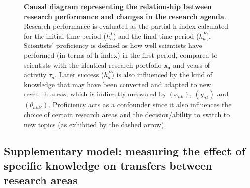 \documentclass{article}
\begin{document}
\begin{figure}[h]
    \centering
    \caption{\textbf{Causal diagram representing the relationship between research performance and changes in the research agenda}. Research performance is evaluated as the partial h-index calculated for the initial time-period ($h_a^I$) and the final time-period ($h_a^F$). Scientists' proficiency is defined as how well scientists have performed (in terms of h-index) in the first period, compared to scientists with the identical research portfolio $\bm{x_a}$ and years of activity $\tau_a$. Later success ($h_a^F$) is also influenced by the kind of knowledge that may have been converted and adapted to new research areas, which is indirectly measured by $(x_{ak})$, $(y_{ak})$ and $(\theta_{akk'})$. Proficiency acts as a confounder since it also influences the choice of certain research areas and the decision/ability to switch to new topics (as exhibited by the dashed arrow). }
    \label{fig:outcomes_causal_dag}
\end{figure}


\subsection{\label{appendix:knowledge}Supplementary model: measuring the effect of specific knowledge on transfers between research areas}
\end{document}
